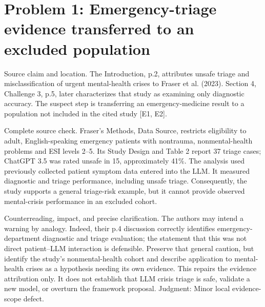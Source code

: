 \documentclass[10pt]{article}
\begin{document}
\section*{Problem 1: Emergency-triage evidence transferred to an excluded population}
Source claim and location. The Introduction, p.2, attributes unsafe triage and misclassification of urgent mental-health crises to Fraser et al. (2023). Section 4, Challenge 3, p.5, later characterizes that study as examining only diagnostic accuracy. The suspect step is transferring an emergency-medicine result to a population not included in the cited study [E1, E2].\par
Complete source check. Fraser’s Methods, Data Source, restricts eligibility to adult, English-speaking emergency patients with nontrauma, nonmental-health problems and ESI levels 2–5. Its Study Design and Table 2 report 37 triage cases; ChatGPT 3.5 was rated unsafe in 15, approximately 41\%. The analysis used previously collected patient symptom data entered into the LLM. It measured diagnostic and triage performance, including unsafe triage. Consequently, the study supports a general triage-risk example, but it cannot provide observed mental-crisis performance in an excluded cohort.\par
Counterreading, impact, and precise clarification. The authors may intend a warning by analogy. Indeed, their p.4 discussion correctly identifies emergency-department diagnostic and triage evaluation; the statement that this was not direct patient–LLM interaction is defensible. Preserve that general caution, but identify the study’s nonmental-health cohort and describe application to mental-health crises as a hypothesis needing its own evidence. This repairs the evidence attribution only. It does not establish that LLM crisis triage is safe, validate a new model, or overturn the framework proposal. Judgment: Minor local evidence-scope defect.\par
\end{document}
